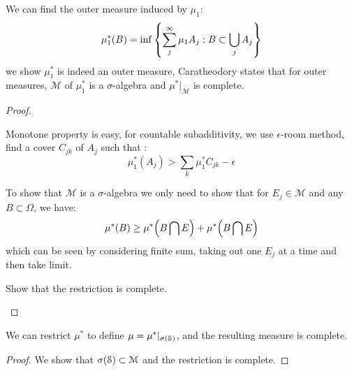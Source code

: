 \begin{thm}
    We can find the outer measure induced by \(\mu_{1}\): 
    \begin{equation*}
        \mu^{*}_{1}(B) = \inf\Bqty{\sum^{\infty}_{j} \mu_{1} A_{j}: B \subset \cup_{j}A_{j}}
    \end{equation*}
    we show \(\mu^{*}_{1}\) is indeed an outer measure, Caratheodory states that for outer measures, \(\mathcal{M}\) of \(\mu^{*}_{1}\) is a \(\sigma\)-algebra and \(\mu^{*}|_{\mathcal{M}}\) is complete. 
\end{thm}
\begin{proof}
    \begin{summary}[1]
        Monotone property is easy, for countable subadditivity, we use \(\epsilon\)-room method, find a cover \(C_{jk}\) of \(A_{j}\) such that :
        \begin{equation*}
            \mu^{*}_{1}(A_{j}) > \sum_{k} \mu^{*}_{1}C_{jk} - \epsilon
        \end{equation*}
    \end{summary}
    \begin{summary}[2]
        To show that \(\mathcal{M}\) is a \(\sigma\)-algebra we only need to show that for \(E_{j} \in \mathcal{M}\) and any \(B \subset \Omega\), we have:
        \begin{equation*}
            \mu^{*} (B ) \geq \mu^{*} \pqty{B \cap E} + \mu^{*} \pqty{B \cap E}
        \end{equation*}
        which can be seen by considering finite sum, taking out one \(E_{j}\) at a time and then take limit. 
    \end{summary}
    \begin{summary}[3]
        Show that the restriction is complete.
    \end{summary}
\end{proof}


\begin{thm}
    We can restrict \(\mu^{*}\) to define \(\mu= \mu^{*}|_{\sigma\pqty{\mathcal{S}}}\), and the resulting measure is complete. 
\end{thm}

\begin{proof}
    We show that \(\sigma\pqty{\mathcal{S}}\subset \mathcal{M}\) and the restriction is complete. 
\end{proof}

